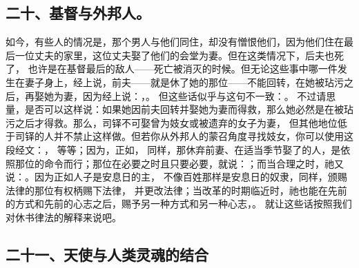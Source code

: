\subsection{二十、基督与外邦人。}

如今，有些人的情况是，那个男人与他们同住，却没有憎恨他们，因为他们住在最后一位丈夫的家里，这位丈夫娶了他们的会堂为妻。但在这类情况下，后夫也死了， 也许是在基督最后的敌人——死亡被消灭的时候。但无论这些事中哪一件发生在妻子身上，经上说，前夫——就是休了她的那位——不能回转，在她被玷污之后，再娶她为妻，因为经上说：，。 但这些话似乎与这句不一致：。 不过请思量，是否可以这样说：如果她因前夫回转并娶她为妻而得救，那么她必然是在被玷污之后才得救。那么，司铎不可娶曾为妓女或被遗弃的女子为妻， 但其他地位低于司铎的人并不禁止这样做。但若你从外邦人的蒙召角度寻找妓女，你可以使用这段经文：， 等等；因为，正如， 同样，那休弃前妻、在适当季节娶了的人，是依照那位的命令而行；那位在必要之时且只要必要，就说：；而当合理之时，祂又说：。因为正如人子是安息日的主， 不像百姓那样是安息日的奴隶，同样，颁赐法律的那位有权柄赐下法律， 并更改法律；当改革的时期临近时，祂也能在先前的方式和先前的心志之后，赐予另一种方式和另一种心志，。 就让这些话按照我们对休书律法的解释来说吧。\par


\subsection{二十一、天使与人类灵魂的结合}

